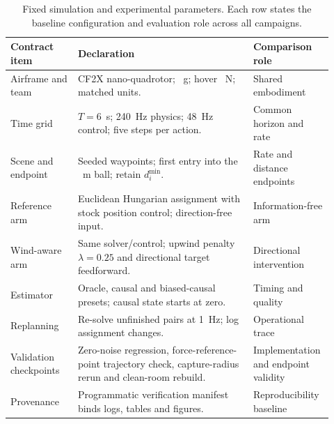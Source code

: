 \begin{table}[!htbp]
\centering
\small
\renewcommand{\arraystretch}{1.08}
\caption{Fixed simulation and experimental parameters. Each row states the baseline configuration and evaluation role across all campaigns.}
\label{tab:parameter-contract}
\begin{tabular}{@{}>{\raggedright\arraybackslash}p{0.20\linewidth}
>{\raggedright\arraybackslash}p{0.52\linewidth}
>{\raggedright\arraybackslash}p{0.20\linewidth}@{}}
\toprule
Contract item & Declaration & Comparison role \\
\midrule
Airframe and team & CF2X nano-quadrotor; \DroneMass{}~g; hover
\HoverThrust{}~N; \NDrones{} matched units. & Shared embodiment \\
Time grid & $T=6$~s; 240~Hz physics; 48~Hz control; five steps per action. &
Common horizon and rate \\
Scene and endpoint & Seeded waypoints; first entry into the \CaptureRadius{}~m
ball; retain $d_i^{\min}$. & Rate and distance endpoints \\
Reference arm & Euclidean Hungarian assignment with stock position control;
direction-free input. & Information-free arm \\
Wind-aware arm & Same solver/control; upwind penalty $\lambda=0.25$ and
directional target feedforward. & Directional intervention \\
Estimator & Oracle, causal and biased-causal presets; causal state starts at zero.
& Timing and quality \\
Replanning & Re-solve unfinished pairs at 1~Hz; log assignment changes. &
Operational trace \\
Validation checkpoints & Zero-noise regression, force-reference-point trajectory
check, capture-radius rerun and clean-room rebuild. & Implementation and endpoint
validity \\
Provenance & Programmatic verification manifest binds logs, tables and figures. &
Reproducibility baseline \\
\bottomrule
\end{tabular}
\end{table}
